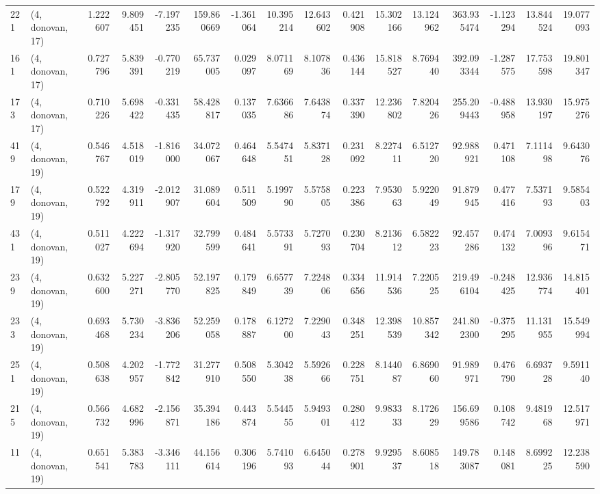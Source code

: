 \begin{tabular}{llrrrrrrrrrrrrrr}
221 &  (4, donovan, 17) &   1.222607 &   9.809451 &  -7.197235 &   159.860669 &  -1.361064 &  10.395214 &  12.643602 &  0.421908 &  15.302166 &  13.124962 &   363.935474 & -1.123294 &  13.844524 &  19.077093 \\
161 &  (4, donovan, 17) &   0.727796 &   5.839391 &  -0.770219 &    65.737005 &   0.029097 &   8.071169 &   8.107836 &  0.436144 &  15.818527 &   8.769440 &   392.093344 & -1.287575 &  17.753598 &  19.801347 \\
173 &  (4, donovan, 17) &   0.710226 &   5.698422 &  -0.331435 &    58.428817 &   0.137035 &   7.636686 &   7.643874 &  0.337390 &  12.236802 &   7.820426 &   255.209443 & -0.488958 &  13.930197 &  15.975276 \\
419 &  (4, donovan, 19) &   0.546767 &   4.518019 &  -1.816000 &    34.072067 &   0.464648 &   5.547451 &   5.837128 &  0.231092 &   8.227411 &   6.512720 &    92.988921 &  0.471108 &   7.111498 &   9.643076 \\
179 &  (4, donovan, 19) &   0.522792 &   4.319911 &  -2.012907 &    31.089604 &   0.511509 &   5.199790 &   5.575805 &  0.223386 &   7.953063 &   5.922049 &    91.879945 &  0.477416 &   7.537193 &   9.585403 \\
431 &  (4, donovan, 19) &   0.511027 &   4.222694 &  -1.317920 &    32.799599 &   0.484641 &   5.573391 &   5.727093 &  0.230704 &   8.213612 &   6.582223 &    92.457286 &  0.474132 &   7.009396 &   9.615471 \\
239 &  (4, donovan, 19) &   0.632600 &   5.227271 &  -2.805770 &    52.197825 &   0.179849 &   6.657739 &   7.224806 &  0.334656 &  11.914536 &   7.220525 &   219.496104 & -0.248425 &  12.936774 &  14.815401 \\
233 &  (4, donovan, 19) &   0.693468 &   5.730234 &  -3.836206 &    52.259058 &   0.178887 &   6.127200 &   7.229043 &  0.348251 &  12.398539 &  10.857342 &   241.802300 & -0.375295 &  11.131955 &  15.549994 \\
251 &  (4, donovan, 19) &   0.508638 &   4.202957 &  -1.772842 &    31.277910 &   0.508550 &   5.304238 &   5.592666 &  0.228751 &   8.144087 &   6.869060 &    91.989971 &  0.476790 &   6.693728 &   9.591140 \\
215 &  (4, donovan, 19) &   0.566732 &   4.682996 &  -2.156871 &    35.394186 &   0.443874 &   5.544555 &   5.949301 &  0.280412 &   9.983333 &   8.172629 &   156.699586 &  0.108742 &   9.481968 &  12.517971 \\
11  &  (4, donovan, 19) &   0.651541 &   5.383783 &  -3.346111 &    44.156614 &   0.306196 &   5.741093 &   6.645044 &  0.278901 &   9.929537 &   8.608518 &   149.783087 &  0.148081 &   8.699225 &  12.238590 \\

\end{tabular}
